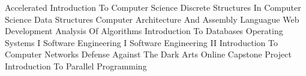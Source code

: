 
\begin{itemize}[label=$\triangleright$]
 Accelerated Introduction To Computer Science
 Discrete Structures In Computer Science
 Data Structures
 Computer Architecture And Assembly Languague
 Web Development
 Analysis Of Algorithms
 Introduction To Databases
 Operating Systems I
 Software Engineering I
 Software Engineering II
 Introduction To Computer Networks
 Defense Against The Dark Arts
 Online Capstone Project
 Introduction To Parallel Programming
\end{itemize}
